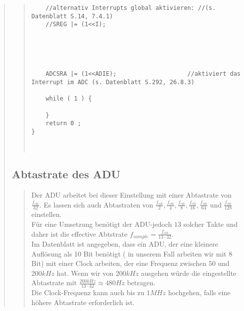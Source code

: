 \begin{quote}
\begin{quote}
\begin{lstlisting}
    //alternativ Interrupts global aktivieren: //(s. Datenblatt S.14, 7.4.1)
    //SREG |= (1<<I);                           
                                            
    



    ADCSRA |= (1<<ADIE);                    //aktiviert das Interrupt im ADC (s. Datenblatt S.292, 26.8.3)

    while ( 1 ) {

    }
    return 0 ;
}



\end{lstlisting}         
    \end{quote}

    \subsection{Abtastrate des ADU}
    \begin{quote}
        Der ADU arbeitet bei dieser Einstellung mit einer Abtastrate von $\frac{f_{clk}}{32}$. Es lassen sich auch
        Abtastraten von $\frac{f_{clk}}{2}, \frac{f_{clk}}{4}, \frac{f_{clk}}{8}, \frac{f_{clk}}{16},
        \frac{f_{clk}}{64}$ und $\frac{f_{clk}}{128}$ einstellen.\\
        Für eine Umsetzung benötigt der ADU-jedoch $13$ solcher Takte und daher ist die effective Abtstrate $f_{sample}
        = \frac{f_{clk}}{13 \cdot   32}$.\\
        Im Datenblatt ist angegeben, dass ein ADU, der eine kleinere Auflösung
        als 10 Bit benötigt ( in unserem Fall arbeiten wir mit 8 Bit) mit einer
        Clock arbeiten, der eine Frequenz zwischen $50$ und $200 kHz$ hat. Wenn
        wir von $200 kHz$ ausgehen würde die eingestellte Abtastrate mit
        $\frac{200 kHz}{13 \cdot 32} \approx 480 Hz$ betragen.\\
        
        Die Clock-Frequenz kann auch bis zu $1 MHz$ hochgehen, falls eine höhere
        Abtastrate erforderlich ist.
        
        
    \end{quote}

\end{quote}


